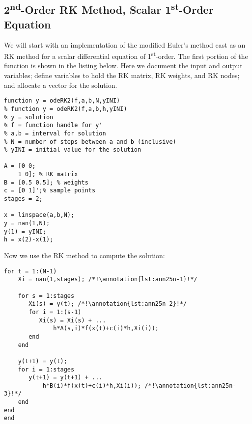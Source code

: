 \subsection{2\textsuperscript{nd}-Order RK Method, Scalar 1\textsuperscript{st}-Order Equation}
We will start with an implementation of the modified Euler's method cast as an RK method for a scalar differential equation of 1\textsuperscript{st}-order.  The first portion of the function is shown in the listing below. Here we document the input and output variables; define variables to hold the RK matrix, RK weights, and RK nodes; and allocate a vector for the solution.

\begin{lstlisting}[style=myMatlab,name=lec25n-1]
function y = odeRK2(f,a,b,N,yINI)
% function y = odeRK2(f,a,b,h,yINI)
% y = solution
% f = function handle for y'
% a,b = interval for solution
% N = number of steps between a and b (inclusive)
% yINI = initial value for the solution

A = [0 0;
    1 0]; % RK matrix
B = [0.5 0.5]; % weights
c = [0 1]';% sample points
stages = 2;

x = linspace(a,b,N);
y = nan(1,N);
y(1) = yINI;
h = x(2)-x(1);
\end{lstlisting}

\noindent Now we use the RK method to compute the solution:
\begin{lstlisting}[style=myMatlab,name=lec25n-1]
for t = 1:(N-1)
    Xi = nan(1,stages); /*!\annotation{lst:ann25n-1}!*/
    
    for s = 1:stages
       Xi(s) = y(t); /*!\annotation{lst:ann25n-2}!*/
       for i = 1:(s-1)
          Xi(s) = Xi(s) + ...
              h*A(s,i)*f(x(t)+c(i)*h,Xi(i)); 
       end
    end
    
    y(t+1) = y(t);
    for i = 1:stages
       y(t+1) = y(t+1) + ...
           h*B(i)*f(x(t)+c(i)*h,Xi(i)); /*!\annotation{lst:ann25n-3}!*/
    end    
end
end
\end{lstlisting}


